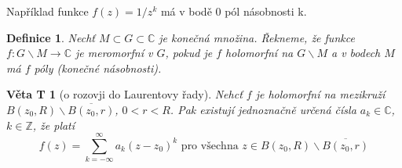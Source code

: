 \documentclass[11pt,a4paper]{article}
\newcounter{vety}
\newtheorem*{definice}{Definice}
\newtheorem{vetat}[vety]{Věta T}
\begin{document}
Například funkce $f(z) = 1 / z^k$ má v bodě 0 pól násobnosti k.

\begin{definice}
Nechť $M \subset G \subset \mathbb{C}$ je konečná množina. Řekneme, že funkce $f : G \backslash M \rightarrow \mathbb{C}$ je \emph{meromorfní} v $G$, pokud je $f$ holomorfní na $G \backslash M$ a v bodech $M$ má $f$ póly (konečné násobnosti).
\end{definice}

\begin{vetat}[o rozovji do Laurentovy řady]
Nehcť $f$ je holomorfní na mezikruží $B(z_0, R) \backslash \overline{B(z_0, r)}$, $0 < r < R$. Pak existují jednoznačně určená čísla $a_k \in \mathbb{C}$, $k \in \mathbb{Z}$, že platí 
$$f(z) = \sum_{k= - \infty}^\infty a_k (z-z_0)^k \textrm{ pro všechna } z \in B(z_0, R) \backslash \overline{B(z_0, r)}$$
\end{vetat}
\end{document}
